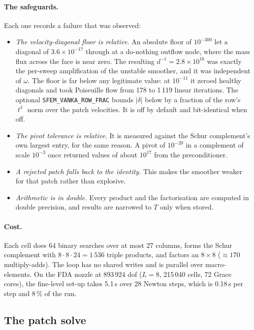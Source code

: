 \documentclass[11pt,a4paper]{article}
\newcommand{\code}[1]{\texttt{\small #1}}
\begin{document}
\paragraph{The safeguards.} Each one records a failure that was observed:
\begin{itemize}[leftmargin=*]
\item \emph{The velocity-diagonal floor is relative.} An absolute floor of $10^{-300}$ let a
diagonal of $3.6\times10^{-17}$ through at a do-nothing outflow node, where the mass flux
across the face is near zero. The resulting $d^{-1} = 2.8\times10^{16}$ was exactly the
per-sweep amplification of the unstable smoother, and it was independent of $\omega$. The
floor is far below any legitimate value: at $10^{-11}$ it zeroed healthy diagonals and took
Poiseuille flow from 178 to 1\,119 linear iterations. The optional
\code{SFEM\_VANKA\_ROW\_FRAC} bounds $|\delta|$ below by a fraction of the row's $\ell^1$ norm
over the patch velocities. It is off by default and bit-identical when off.
\item \emph{The pivot tolerance is relative.} It is measured against the Schur complement's
own largest entry, for the same reason. A pivot of $10^{-20}$ in a complement of scale
$10^{-3}$ once returned values of about $10^{17}$ from the preconditioner.
\item \emph{A rejected patch falls back to the identity.} This makes the smoother weaker for
that patch rather than explosive.
\item \emph{Arithmetic is in double.} Every product and the factorisation are computed in
double precision, and results are narrowed to $T$ only when stored.
\end{itemize}

\paragraph{Cost.} Each cell does 64 binary searches over at most 27 columns, forms the Schur
complement with $8\cdot8\cdot24 = 1\,536$ triple products, and factors an $8\times8$
($\approx 170$ multiply-adds). The loop has no shared writes and is parallel over
macro-elements. On the FDA nozzle at 893\,924 dof ($L=8$, 215\,040 cells, 72 Grace cores),
the fine-level set-up takes 5.1\,s over 28 Newton steps, which is 0.18\,s per step and 8\,\%
of the run.

\subsection{The patch solve}
\end{document}
